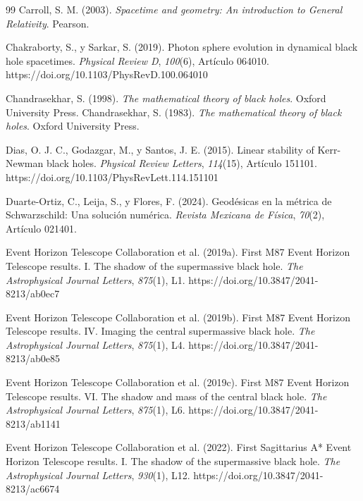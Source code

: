 \documentclass[twoside,onehalfspace]{./Portada/unmsmtesis}
\begin{document}
\begin{thebibliography}{99}
 Carroll, S. M. (2003). \textit{Spacetime and geometry: An introduction to General Relativity}. Pearson.

 Chakraborty, S., y Sarkar, S. (2019). Photon sphere evolution in dynamical black hole spacetimes. \textit{Physical Review D}, \textit{100}(6), Artículo 064010. https://doi.org/10.1103/PhysRevD.100.064010

 Chandrasekhar, S. (1998). \textit{The mathematical theory of black holes}. Oxford University Press.
 Chandrasekhar, S. (1983). \textit{The mathematical theory of black holes}. Oxford University Press.

 Dias, O. J. C., Godazgar, M., y Santos, J. E. (2015). Linear stability of Kerr-Newman black holes. \textit{Physical Review Letters}, \textit{114}(15), Artículo 151101. https://doi.org/10.1103/PhysRevLett.114.151101

 Duarte-Ortiz, C., Leija, S., y Flores, F. (2024). Geodésicas en la métrica de Schwarzschild: Una solución numérica. \textit{Revista Mexicana de Física}, \textit{70}(2), Artículo 021401.

 Event Horizon Telescope Collaboration et al. (2019a). First M87 Event Horizon Telescope results. I. The shadow of the supermassive black hole. \textit{The Astrophysical Journal Letters}, \textit{875}(1), L1. https://doi.org/10.3847/2041-8213/ab0ec7

 Event Horizon Telescope Collaboration et al. (2019b). First M87 Event Horizon Telescope results. IV. Imaging the central supermassive black hole. \textit{The Astrophysical Journal Letters}, \textit{875}(1), L4. https://doi.org/10.3847/2041-8213/ab0e85

 Event Horizon Telescope Collaboration et al. (2019c). First M87 Event Horizon Telescope results. VI. The shadow and mass of the central black hole. \textit{The Astrophysical Journal Letters}, \textit{875}(1), L6. https://doi.org/10.3847/2041-8213/ab1141

 Event Horizon Telescope Collaboration et al. (2022). First Sagittarius A* Event Horizon Telescope results. I. The shadow of the supermassive black hole. \textit{The Astrophysical Journal Letters}, \textit{930}(1), L12. https://doi.org/10.3847/2041-8213/ac6674


\end{thebibliography}
\end{document}
